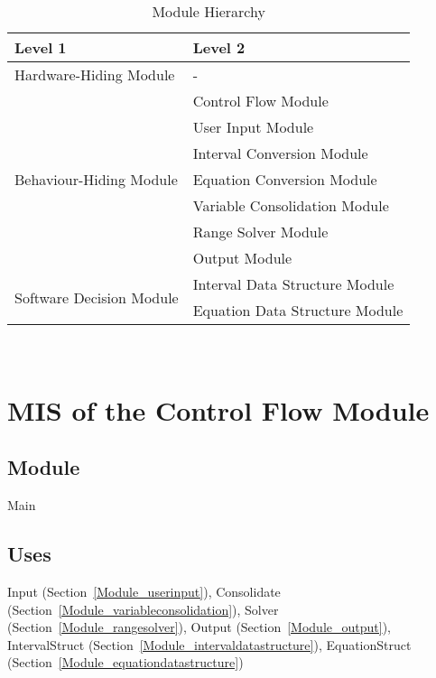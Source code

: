 \documentclass[12pt, titlepage]{article}
\begin{document}
\begin{table}[h!]
	\centering
	\begin{tabular}{p{} p{}}
		\toprule
		\textbf{Level 1} & \textbf{Level 2}\\
		\midrule
		
		{Hardware-Hiding Module} & - \\
		\midrule
		
		\multirow{7}{0.29\textwidth}{Behaviour-Hiding Module} & Control Flow 
		Module \\
		& User Input Module \\
		& Interval Conversion Module \\
		& Equation Conversion Module \\
		& Variable Consolidation Module \\
		& Range Solver Module \\
		& Output Module \\
		\midrule
		
		\multirow{2}{0.29\textwidth}{Software Decision Module} & Interval Data 
		Structure Module \\
		& Equation Data Structure Module \\
		\bottomrule
		
	\end{tabular}
	\caption{Module Hierarchy}
	\label{TblMH}
\end{table}

~\newpage

\section{MIS of the Control Flow Module} 
\label{Module_controlflow}

\subsection{Module}

Main

\subsection{Uses}

Input (Section~\ref{Module_userinput}), Consolidate 
(Section~\ref{Module_variableconsolidation}), Solver 
(Section~\ref{Module_rangesolver}), Output (Section~\ref{Module_output}), 
IntervalStruct (Section~\ref{Module_intervaldatastructure}), EquationStruct 
(Section~\ref{Module_equationdatastructure})
\end{document}
